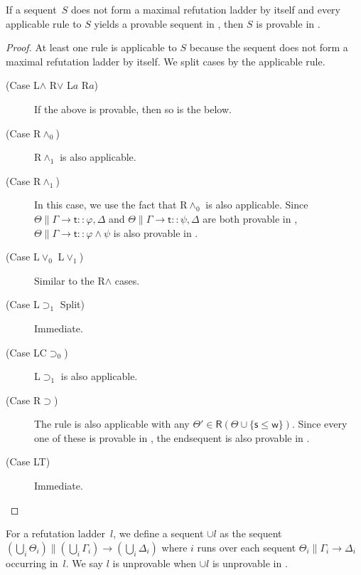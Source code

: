    \begin{proposition}\label{chooser}
    If a sequent~$S$ does not form a maximal refutation ladder by itself and
    every applicable rule to $S$ yields a provable
    sequent in \LB, then $S$ is provable in \LB.
   \end{proposition}
   \begin{proof}
    At least one rule is applicable to $S$ because the sequent does
    not form a maximal refutation ladder by itself. We split cases by the
    applicable rule.
    \begin{description}
     \item[ (Case L$\wedge$ R$\vee$ L$a$ R$a$)]
	  If the above is provable, then so is the below.
     \item[ (Case R$\wedge_0$)]
	  R$\wedge_1$ is also applicable.
     \item[ (Case R$\wedge_1$)]
	  In this case, we use the fact that R$\wedge_0$ is also
	  applicable.
	  Since $\Theta\parallel\Gamma\longrightarrow \mathsf t::\varphi, \Delta$ and
	  $\Theta\parallel\Gamma\longrightarrow \mathsf t::\psi,
	  \Delta$ are both provable in \LB,
	  $\Theta\parallel\Gamma\longrightarrow \mathsf
	  t::\varphi\land\psi$ is also provable in \LB.
     \item[ (Case L$\vee_0$ L$\vee_1$)]
	  Similar to the R$\wedge$ cases.
     \item[ (Case L$\supset_1$ Split)] Immediate.
     \item[ (Case LC$\supset_0$)]
	  L$\supset_1$ is also applicable.
     \item[ (Case R$\supset$)]
	  The rule is also applicable with any $\Theta'\in
	  \mathsf R(\Theta\cup\{\mathsf s\le \mathsf w\})$. Since every one of these is
	  provable in \LB,
	  the endsequent is also provable in \LB.
     \item[ (Case LT)] Immediate.
    \end{description}
   \end{proof}

   For a refutation ladder~$l$, we define a sequent $\cup l$ as
   the sequent $\left(\bigcup_i \Theta_i\right)\parallel \left(\bigcup_i \Gamma_i\right)\longrightarrow
   \left(\bigcup_i\Delta_i\right)$ where $i$ runs over
   each sequent $\Theta_i\parallel \Gamma_i\longrightarrow\Delta_i$
   occurring in~$l$.
   We say $l$ is unprovable when $\cup l$ is
   unprovable in \LB.


